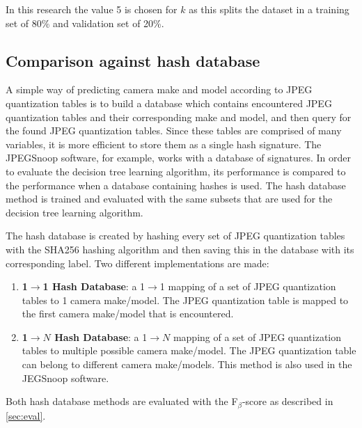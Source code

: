 In this research the value 5 is chosen for $k$ as this splits the dataset in a training set of 80\% and validation set of 20\%.

\subsection{Comparison against hash database}
A simple way of predicting camera make and model according to JPEG quantization tables is to build a database which contains encountered JPEG quantization tables and their corresponding make and model, and then query for the found JPEG quantization tables. Since these tables are comprised of many variables, it is more efficient to store them as a single hash signature. The JPEGSnoop software, for example, works with a database of signatures. In order to evaluate the decision tree learning algorithm, its performance is compared to the performance when a database containing hashes is used. The hash database method is trained and evaluated with the same subsets that are used for the decision tree learning algorithm. 

The hash database is created by hashing every set of JPEG quantization tables with the SHA256 hashing algorithm and then saving this in the database with its corresponding label. Two different implementations are made:
\begin{enumerate}
\item \textbf{1$\rightarrow$1 Hash Database}: a 1$\rightarrow$1 mapping of a set of JPEG quantization tables to 1 camera make/model. The JPEG quantization table is mapped to the first camera make/model that is encountered.
\item \textbf{1$\rightarrow N$ Hash Database}: a 1$\rightarrow N$ mapping of a set of JPEG quantization tables to multiple possible camera make/model. The JPEG quantization table can belong to different camera make/models. This method is also used in the JEGSnoop software. 
\end{enumerate}

Both hash database methods are evaluated with the F$_\beta$-score as described in \autoref{sec:eval}.
